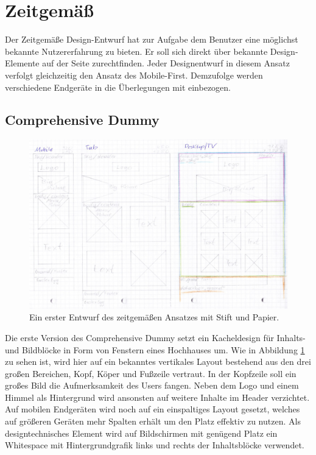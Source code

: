 \section{Zeitgemäß}
Der Zeitgemäße Design-Entwurf hat zur Aufgabe dem Benutzer eine möglichst bekannte Nutzererfahrung zu bieten. Er soll sich direkt über bekannte Design-Elemente auf der Seite zurechtfinden. 
Jeder Designentwurf in diesem Ansatz verfolgt gleichzeitig den Ansatz des Mobile-First. Demzufolge werden verschiedene Endgeräte in die Überlegungen mit einbezogen.

\subsection{Comprehensive Dummy}
\begin{figure} [hp]
	\includegraphics[width=\textwidth]{./img/zeitg_comp1.jpg}
	\caption{Ein erster Entwurf des zeitgemäßen Ansatzes mit Stift und Papier.}
	\label{zeitg:Comp1}
\end{figure}

Die erste Version des Comprehensive Dummy setzt ein Kacheldesign für Inhalts- und Bildblöcke in Form von Fenstern eines Hochhauses um. Wie in Abbildung \ref{zeitg:Comp1} zu sehen ist, wird hier auf ein bekanntes vertikales Layout bestehend aus den drei großen Bereichen, Kopf, Köper und Fußzeile vertraut. In der Kopfzeile soll ein großes Bild die Aufmerksamkeit des Users fangen. Neben dem Logo und einem Himmel als Hintergrund wird ansonsten auf weitere Inhalte im Header verzichtet. Auf mobilen Endgeräten wird noch auf ein einspaltiges Layout gesetzt, welches auf größeren Geräten mehr Spalten erhält um den Platz effektiv zu nutzen. Als designtechnisches Element wird auf Bildschirmen mit genügend Platz ein Whitespace mit Hintergrundgrafik links und rechts der Inhaltsblöcke verwendet.

